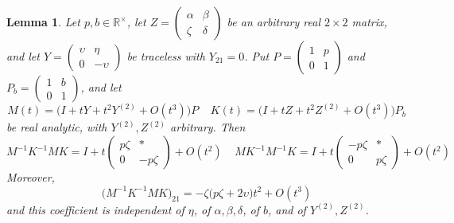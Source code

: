 \documentclass[10pt,a4paper]{amsart}
\newtheorem{lemma}{Lemma}
\begin{document}
\begin{lemma}\label{lma:commutatorasymptotics}
Let $p, b \in \mathbb R^\times$, let $Z = \left(\begin{smallmatrix}\alpha&\beta\\\zeta&\delta\end{smallmatrix}\right)$ be an arbitrary real $2\times 2$ matrix, and let $Y = \left(\begin{smallmatrix}\upsilon&\eta\\0&-\upsilon\end{smallmatrix}\right)$ be traceless with $Y_{21} = 0$. Put $P = \left(\begin{smallmatrix}1&p\\0&1\end{smallmatrix}\right)$ and $P_b = \left(\begin{smallmatrix}1&b\\0&1\end{smallmatrix}\right)$, and let
\begin{equation*}
	M(t) = \bigl(I + tY + t^2Y^{(2)} + O(t^3)\bigr)P \ \ \ \ \
	K(t) = \bigl(I + tZ + t^2Z^{(2)} + O(t^3)\bigr)P_b
\end{equation*}
be real analytic, with $Y^{(2)}, Z^{(2)}$ arbitrary. Then
\begin{equation*}
	M^{-1}K^{-1}MK = I + t\begin{pmatrix}p\zeta & * \\ 0 & -p\zeta\end{pmatrix} + O(t^2) \ \ \ \ \
	MK^{-1}M^{-1}K = I + t\begin{pmatrix}-p\zeta & * \\ 0 & p\zeta\end{pmatrix} + O(t^2)
\end{equation*}
Moreover,
\begin{equation*}
	\bigl(M^{-1}K^{-1}MK\bigr)_{21} = -\zeta\bigl(p\zeta + 2\upsilon\bigr)t^2 + O(t^3)
\end{equation*}
and this coefficient is independent of $\eta$, of $\alpha, \beta, \delta$, of $b$, and of $Y^{(2)}, Z^{(2)}$.
\end{lemma}
\end{document}
